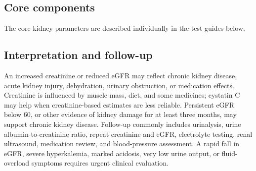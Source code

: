\documentclass[11pt,openany]{book}
\begin{document}
\subsection*{Core components}
The core kidney parameters are described individually in the test guides below.

\subsection*{Interpretation and follow-up}
An increased creatinine or reduced eGFR may reflect chronic kidney disease,
acute kidney injury, dehydration, urinary obstruction, or medication effects.
Creatinine is influenced by muscle mass, diet, and some medicines; cystatin C
may help when creatinine-based estimates are less reliable. Persistent eGFR
below 60, or other evidence of kidney damage for at least three months, may
support chronic kidney disease. Follow-up commonly includes urinalysis, urine
albumin-to-creatinine ratio, repeat creatinine and eGFR, electrolyte testing,
renal ultrasound, medication review, and blood-pressure assessment. A rapid
fall in eGFR, severe hyperkalemia, marked acidosis, very low urine output, or
fluid-overload symptoms requires urgent clinical evaluation.
\end{document}
